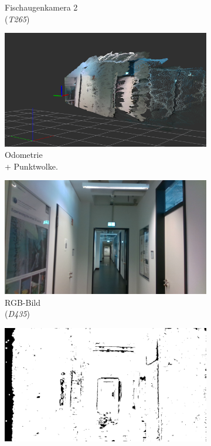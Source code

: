 \begin{figure}[h!]
\begin{subfigure}[b]{0.31\linewidth}
		\caption{Fischaugenkamera 2 \\(\textit{T265})}
	\end{subfigure}
	\medskip
	\begin{subfigure}[b]{0.31\linewidth}
		\centering
	\includegraphics[width=\linewidth]{images/dataset/pointcloud1.png}
	\caption{Odometrie \\ + Punktwolke.}
	\end{subfigure}
	\hfill
	\begin{subfigure}[b]{0.31\linewidth}
		\centering
		\includegraphics[width=\linewidth]{images/dataset/dc_frame000005.png}
		\caption{RGB-Bild \\ (\textit{D435})}
	\end{subfigure}
	\hfill
	\begin{subfigure}[b]{0.31\linewidth}
		\centering
		\includegraphics[width=\linewidth]{images/dataset/dt_frame000005.png}

\end{subfigure}
\end{figure}

